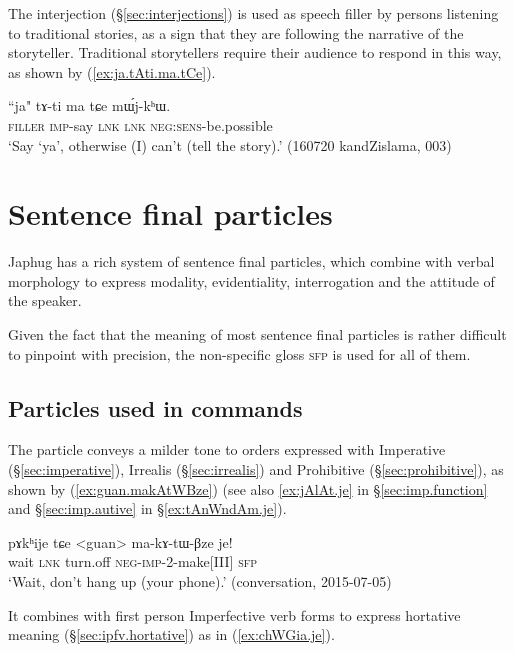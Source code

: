 The interjection  (§\ref{sec:interjections}) is used as speech filler by persons listening to traditional stories, as a sign that they are following the narrative of the storyteller. Traditional storytellers require their audience to respond in this way, as shown by (\ref{ex:ja.tAti.ma.tCe}).

\begin{exe}
\ex \label{ex:ja.tAti.ma.tCe}
\gll ``ja" tɤ-ti ma tɕe mɯ́j-kʰɯ. \\
\textsc{filler} \textsc{imp}-say \textsc{lnk} \textsc{lnk} \textsc{neg}:\textsc{sens}-be.possible \\
\glt `Say `ya', otherwise (I) can't (tell the story).' (160720 kandZislama, 003)
\end{exe}

\section{Sentence final particles} \label{sec:sfp}
Japhug has a rich system of sentence final particles, which combine with verbal morphology to express modality, evidentiality, interrogation and the attitude of the speaker.

Given the fact that the meaning of most sentence final particles is rather difficult to pinpoint with precision, the non-specific gloss \textsc{sfp} is used for all of them.
 
\subsection{Particles used in commands} \label{sec:fsp.imp}
The particle  conveys a milder tone to orders expressed with Imperative (§\ref{sec:imperative}), Irrealis (§\ref{sec:irrealis}) and Prohibitive (§\ref{sec:prohibitive}), as shown by (\ref{ex:guan.makAtWBze}) (see also \ref{ex:jAlAt.je} in §\ref{sec:imp.function} and §\ref{sec:imp.autive} in §\ref{ex:tAnWndAm.je}).


\begin{exe}
\ex \label{ex:guan.makAtWBze}
\gll pɤkʰije tɕe <guan> ma-kɤ-tɯ-βze je! \\
wait \textsc{lnk} turn.off \textsc{neg}-\textsc{imp}-2-make[III] \textsc{sfp} \\
\glt `Wait, don't hang up (your phone).' (conversation, 2015-07-05)
\end{exe}

It combines with first person Imperfective verb forms to express hortative meaning (§\ref{sec:ipfv.hortative}) as in (\ref{ex:chWGia.je}). 


